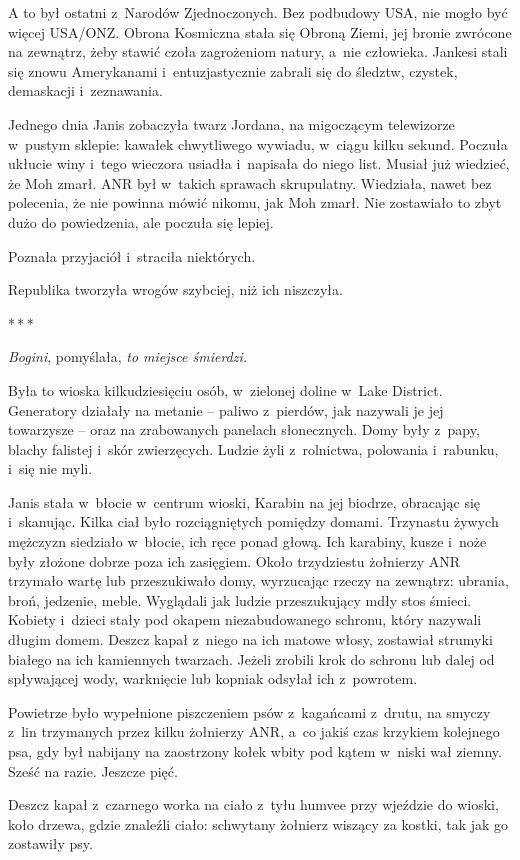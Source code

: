 \documentclass[oneside,polish,11pt,sfheadings]{mwbk}
\newcommand{\threeast}{\bigskip\par\centerline{*\,*\,*}\medskip\par}%
\begin{document}
A to był ostatni z~Narodów Zjednoczonych. Bez podbudowy USA, nie mogło
być więcej USA/ONZ. Obrona Kosmiczna stała się Obroną Ziemi, jej bronie
zwrócone na zewnątrz, żeby stawić czoła zagrożeniom natury, a~nie
człowieka. Jankesi stali się znowu Amerykanami i~entuzjastycznie zabrali
się do śledztw, czystek, demaskacji i~zeznawania.

Jednego dnia Janis zobaczyła twarz Jordana, na migoczącym telewizorze w~pustym sklepie: kawałek chwytliwego wywiadu, w~ciągu kilku sekund.
Poczuła ukłucie winy i~tego wieczora usiadła i~napisała do niego list.
Musiał już wiedzieć, że Moh zmarł. ANR był w~takich sprawach
skrupulatny. Wiedziała, nawet bez polecenia, że nie powinna mówić
nikomu, jak Moh zmarł. Nie zostawiało to zbyt dużo do powiedzenia, ale
poczuła się lepiej.

Poznała przyjaciół i~straciła niektórych.

Republika tworzyła wrogów szybciej, niż ich niszczyła.
  \threeast 

\emph{Bogini}, pomyślała, \emph{to miejsce śmierdzi.}

Była to wioska kilkudziesięciu osób, w~zielonej doline w~Lake District.
Generatory działały na metanie -- paliwo z~pierdów, jak nazywali je jej
towarzysze -- oraz na zrabowanych panelach słonecznych. Domy były z~papy,
blachy falistej i~skór zwierzęcych. Ludzie żyli z~rolnictwa, polowania i~rabunku, i~się nie myli.

Janis stała w~błocie w~centrum wioski, Karabin na jej biodrze, obracając
się i~skanując. Kilka ciał było rozciągniętych pomiędzy domami.
Trzynastu żywych mężczyzn siedziało w~błocie, ich ręce ponad głową. Ich
karabiny, kusze i~noże były złożone dobrze poza ich zasięgiem. Około
trzydziestu żołnierzy ANR trzymało wartę lub przeszukiwało domy,
wyrzucając rzeczy na zewnątrz: ubrania, broń, jedzenie, meble. Wyglądali
jak ludzie przeszukujący mdły stos śmieci. Kobiety i~dzieci stały pod
okapem niezabudowanego schronu, który nazywali długim domem. Deszcz
kapał z~niego na ich matowe włosy, zostawiał strumyki białego na ich
kamiennych twarzach. Jeżeli zrobili krok do schronu lub dalej od
spływającej wody, warknięcie lub kopniak odsyłał ich z~powrotem.

Powietrze było wypełnione piszczeniem psów z~kagańcami z~drutu, na
smyczy z~lin trzymanych przez kilku żołnierzy ANR, a~co jakiś czas
krzykiem kolejnego psa, gdy był nabijany na zaostrzony kołek wbity pod
kątem w~niski wał ziemny. Sześć na razie. Jeszcze pięć.

Deszcz kapał z~czarnego worka na ciało z~tyłu humvee przy wjeździe do
wioski, koło drzewa, gdzie znaleźli ciało: schwytany żołnierz wiszący za
kostki, tak jak go zostawiły psy.
\end{document}
